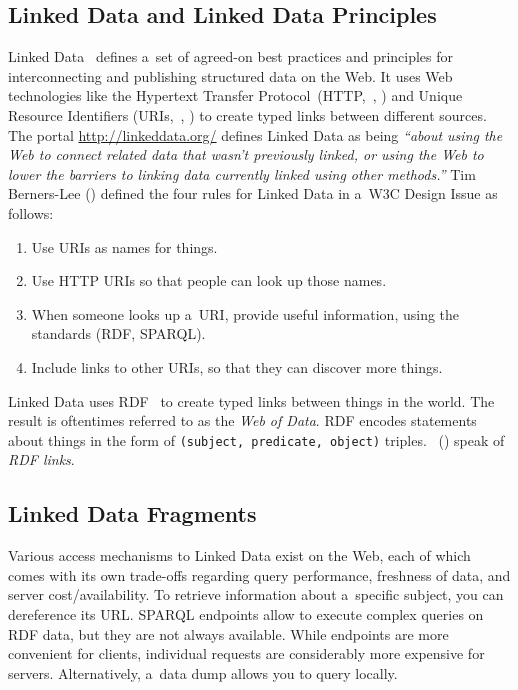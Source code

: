 \documentclass[letterpaper]{article}
\newcommand\citep[1]{\citeauthor{#1}, \citeyear{#1}}
\newcommand\citet[1]{\citeauthor{#1}~(\citeyear{#1})}
\begin{document}
\subsection{Linked Data and Linked Data Principles}

Linked Data~\cite{bernerslee2006linkeddata}
defines a~set of agreed-on best practices and
principles for interconnecting and publishing
structured data on the Web.
It uses Web technologies like the Hypertext Transfer Protocol~(HTTP,~\citep{fielding1999http})
and Unique Resource Identifiers (URIs,~\citep{bernerslee2005uri})
to create typed links between different sources.
The portal \url{http://linkeddata.org/}
defines Linked Data as being
\textit{``about using the Web to connect related data that
wasn't previously linked, or using the Web
to lower the barriers to linking data
currently linked using other methods.''}
Tim Berners-Lee (\citeyear{bernerslee2006linkeddata}) defined the four rules for Linked Data in a~W3C Design Issue as follows:

\begin{enumerate}
  \item Use URIs as names for things.
  \item Use HTTP URIs so that people can look up those names.
  \item When someone looks up a~URI, provide useful information,
        using the standards (RDF, SPARQL).
  \item Include links to other URIs,
        so that they can discover more things.
\end{enumerate}

Linked Data uses RDF~\cite{klyne2004rdf} to create
typed links between things in the world.
The result is oftentimes referred to as the \emph{Web of Data}.
RDF encodes statements about things in the form of
\texttt{(subject, predicate, object)} triples.
\citet{heath2011linkeddata} speak of \emph{RDF links}.

\subsection{Linked Data Fragments}
Various access mechanisms to Linked Data exist on the Web,
each of which comes with its own trade-offs regarding
query performance, freshness of data, and server cost/availability.
To retrieve information about a~specific subject,
you can dereference its URL.
SPARQL endpoints allow to execute complex queries on RDF data,
but they are not always available.
While endpoints are more convenient for clients,
individual requests are considerably more expensive for servers.
Alternatively, a~data dump allows you to query locally.
\end{document}
